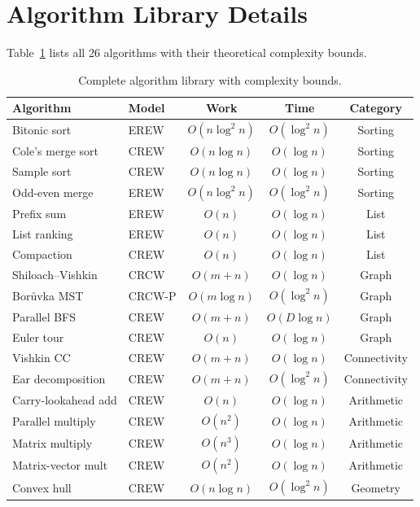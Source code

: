 \documentclass[11pt]{article}
\begin{document}
\section{Algorithm Library Details}
\label{app:algorithms}

Table~\ref{tab:algorithms} lists all 26 algorithms with their
theoretical complexity bounds.

\begin{table}[h]
\centering
\caption{Complete algorithm library with complexity bounds.}
\label{tab:algorithms}
\small
\begin{tabular}{@{}llccc@{}}
\toprule
\textbf{Algorithm} & \textbf{Model} & \textbf{Work} & \textbf{Time}
  & \textbf{Category} \\
\midrule
Bitonic sort & EREW & $O(n\log^2 n)$ & $O(\log^2 n)$ & Sorting \\
Cole's merge sort & CREW & $O(n\log n)$ & $O(\log n)$ & Sorting \\
Sample sort & CREW & $O(n\log n)$ & $O(\log n)$ & Sorting \\
Odd-even merge & EREW & $O(n\log^2 n)$ & $O(\log^2 n)$ & Sorting \\
Prefix sum & EREW & $O(n)$ & $O(\log n)$ & List \\
List ranking & EREW & $O(n)$ & $O(\log n)$ & List \\
Compaction & CREW & $O(n)$ & $O(\log n)$ & List \\
Shiloach--Vishkin & CRCW & $O(m+n)$ & $O(\log n)$ & Graph \\
Bor\r{u}vka MST & CRCW-P & $O(m\log n)$ & $O(\log^2 n)$ & Graph \\
Parallel BFS & CREW & $O(m+n)$ & $O(D\log n)$ & Graph \\
Euler tour & CREW & $O(n)$ & $O(\log n)$ & Graph \\
Vishkin CC & CREW & $O(m+n)$ & $O(\log n)$ & Connectivity \\
Ear decomposition & CREW & $O(m+n)$ & $O(\log^2 n)$ & Connectivity \\
Carry-lookahead add & CREW & $O(n)$ & $O(\log n)$ & Arithmetic \\
Parallel multiply & CREW & $O(n^2)$ & $O(\log n)$ & Arithmetic \\
Matrix multiply & CREW & $O(n^3)$ & $O(\log n)$ & Arithmetic \\
Matrix-vector mult & CREW & $O(n^2)$ & $O(\log n)$ & Arithmetic \\
Convex hull & CREW & $O(n\log n)$ & $O(\log^2 n)$ & Geometry \\

\end{tabular}
\end{table}
\end{document}
